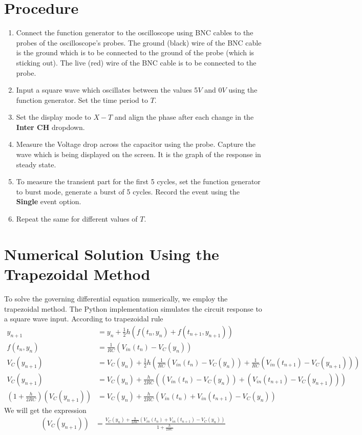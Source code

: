 \documentclass[12pt]{article}
\newcommand{\brak}[1]{\ensuremath{\left(#1\right)}}
\begin{document}
\section{Procedure}

\begin{enumerate}
    \item Connect the function generator to the oscilloscope using BNC cables to the probes of the oscilloscope's probes.
    The ground (black) wire of the BNC cable is the ground which is to be connected to the ground of the probe (which is sticking out). The live (red) wire of the BNC cable is to be connected to the probe.
    \item Input a square wave which oscillates between the values 5$V$ and 0$V$ using the function generator. Set the time period to $T$.
    \item Set the display mode to $X - T$ and align the phase after each change in the \textbf{Inter CH} dropdown.
    \item Measure the Voltage drop across the capacitor using the probe. Capture the wave which is being displayed on the screen. It is the graph of the response in steady state.
    \item To measure the transient part for the first 5 cycles, set the function generator to burst mode, generate a burst of 5 cycles. Record the event using the \textbf{Single} event option.
    \item Repeat the same for different values of $T$.
\end{enumerate}

\section{Numerical Solution Using the Trapezoidal Method}
To solve the governing differential equation numerically, we employ the trapezoidal method. The Python implementation simulates the circuit response to a square wave input.\newline
According to trapezoidal rule
\begin{align}
  y_{n+1}&=y_n+\frac{1}{2}h\brak{f(t_n,y_{n}) + f(t_{n+1},y_{n+1})}\\
  f(t_n, y_n) &= \frac{1}{RC}(V_{in}(t_n) - V_{C}(y_n))\\
  V_{C}(y_{n+1})&=V_{C}(y_n)+\frac{1}{2}h (\frac{1}{RC}(V_{in}(t_n) - V_{C}(y_n))+\frac{1}{RC}(V_{in}(t_{n+1}) - V_{C}(y_{n+1})))\\
  V_{C}(y_{n+1})&=V_{C}(y_n)+\frac{h}{2RC}((V_{in}(t_n) - V_{C}(y_n))+(V_{in}(t_{n+1}) - V_{C}(y_{n+1})))\\
  (1+\frac{h}{2RC})(V_{C}(y_{n+1})) &= V_C(y_n)+\frac{h}{2RC}(V_{in}(t_n)+V_{in}(t_{n+1})- V_{C}(y_n))
\end{align}
We will get the expression
\begin{align}
	(V_{C}(y_{n+1})) &= \frac{V_C(y_n)+\frac{h}{2RC}(V_{in}(t_n)+V_{in}(t_{n+1})- V_{C}(y_n))}{1+\frac{h}{2RC}}
\end{align}
\end{document}
